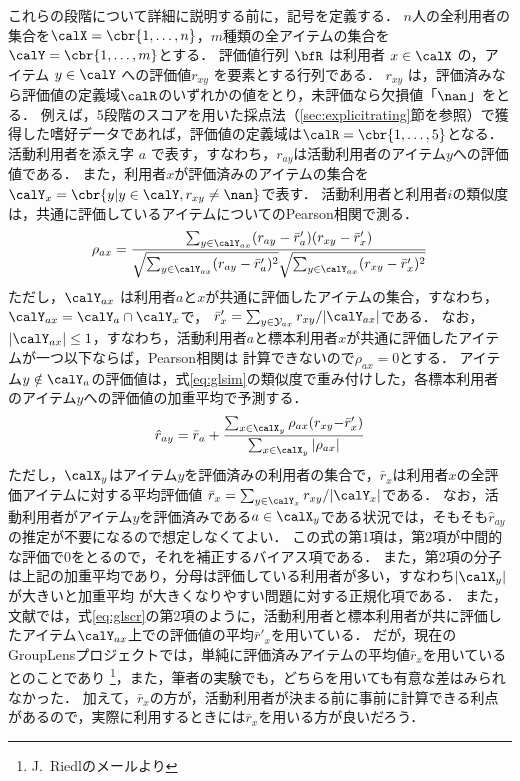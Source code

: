 これらの段階について詳細に説明する前に，記号を定義する．
$n$人の全利用者の集合を$\calX=\cbr{1,\dotsc,n}$，$m$種類の全アイテムの集合を$\calY=\cbr{1,\dotsc,m}$とする．
評価値行列 $\bfR$ は利用者 $x\in\calX$ の，アイテム $y\in \calY$ への評価値$r_{xy}$ を要素とする行列である．
$r_{xy}$ は，評価済みなら評価値の定義域$\calR$のいずれかの値をとり，未評価なら欠損値「$\nan$」をとる．
例えば，5段階のスコアを用いた採点法（\ref{sec:explicitrating}節を参照）で獲得した嗜好データであれば，評価値の定義域は$\calR=\cbr{1,\dotsc,5}$となる．
活動利用者を添え字 $a$ で表す，すなわち，$r_{ay}$は活動利用者のアイテム$y$への評価値である．
また，利用者$x$が評価済みのアイテムの集合を$\calY_x=\cbr{y| y\in\calY, r_{xy}\ne\nan}$で表す．
活動利用者と利用者$i$の類似度は，共通に評価しているアイテムについてのPearson相関で測る．
\begin{equation}
\rho_{ax}=
\frac{\sum_{y\in\calY_{ax}}(r_{ay}-\bar{r}'_a)(r_{xy}-\bar{r}'_x)}%
{\sqrt{\sum_{y\in\calY_{ax}}(r_{ay}-\bar{r}'_a)^2}\sqrt{\sum_{y\in\calY_{ax}}(r_{xy}-\bar{r}'_x)^2}}
\label{eq:glsim}
\end{equation}
ただし，$\calY_{ax}$ は利用者$a$と$x$が共通に評価したアイテムの集合，すなわち，$\calY_{ax}=\calY_a\cap \calY_x$で，
${\bar{r}'}_x=\sum_{y\in \mathcal{Y}_{ax}}r_{xy}/|\calY_{ax}|$である．
なお，$|\calY_{ax}|\le1$，すなわち，活動利用者$a$と標本利用者$x$が共通に評価したアイテムが一つ以下ならば，Pearson相関は
計算できないので$\rho_{ax}=0$とする．
アイテム$y\notin\calY_a$の評価値は，式\eqref{eq:glsim}の類似度で重み付けした，各標本利用者のアイテム$y$への評価値の加重平均で予測する．
\begin{equation}
\hat{r}_{ay}=
\bar{r}_a+\frac{\sum_{x\in\calX_{y}}\rho_{ax}(r_{xy}{-}\bar{r}'_x)}{\sum_{x\in\calX_{y}}|\rho_{ax}|}
\label{eq:glscr}
\end{equation}
ただし，$\calX_y$はアイテム$y$を評価済みの利用者の集合で，$\bar{r}_{x}$は利用者$x$の全評価アイテムに対する平均評価値 $\bar{r}_x=\sum_{y\in\calY_x}r_{xy}/|\calY_x|$である．
なお，活動利用者がアイテム$y$を評価済みである$a\in\calX_y$である状況では，そもそも$\hat{r}_{ay}$の推定が不要になるので想定しなくてよい．
この式の第1項は，第2項が中間的な評価で0をとるので，それを補正するバイアス項である．
また，第2項の分子は上記の加重平均であり，分母は評価している利用者が多い，すなわち$|\calX_y|$が大きいと加重平均
が大きくなりやすい問題に対する正規化項である．
また，文献\cite{cscw:94:01}では，式\eqref{eq:glscr}の第2項のように，活動利用者と標本利用者が共に評価したアイテム$\calY_{ax}$上での評価値の平均$\bar{r}'_x$を用いている．
だが，現在のGroupLensプロジェクトでは，単純に評価済みアイテムの平均値$\bar{r}_x$を用いているとのことであり%
\footnote{J.~Riedlのメールより}，また，筆者の実験でも，どちらを用いても有意な差はみられなかった．
加えて，$\bar{r}_x$の方が，活動利用者が決まる前に事前に計算できる利点があるので，実際に利用するときには$\bar{r}_x$を用いる方が良いだろう．

